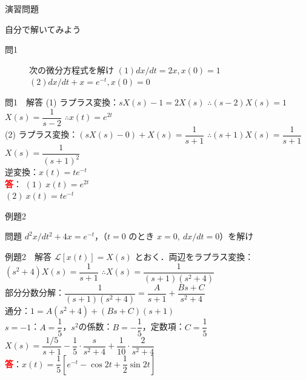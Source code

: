 \documentclass[professionalfonts]{beamer}
\begin{document}
\begin{frame}{演習問題}
  \begin{exampleblock}{自分で解いてみよう}
  \begin{description}
    \item[問1] 次の微分方程式を解け
    $(1) dx/dt = 2x,  x(0) = 1$\\
    $(2) dx/dt + x = e^{-t},  x(0) = 0$\\
  \end{description}
  \end{exampleblock}
\end{frame}

\begin{frame}{問1　解答}
  (1) ラプラス変換：$sX(s) - 1 = 2X(s)$ \quad $\therefore (s-2)X(s) = 1$\\[4pt]
  $X(s) = \dfrac{1}{s-2}$ \quad $\therefore x(t) = e^{2t}$\\[6pt]
  (2) ラプラス変換：$(sX(s)-0) + X(s) = \dfrac{1}{s+1}$ \quad $\therefore (s+1)X(s) = \dfrac{1}{s+1}$\\[4pt]
  $X(s) = \dfrac{1}{(s+1)^{2}}$\\[4pt]
  逆変換：$x(t) = te^{-t}$
  \\[8pt]\textcolor{red}{\textbf{答}}：
  $(1)\ x(t) = e^{2t}$\\
  $(2)\ x(t) = te^{-t}$\\
\end{frame}

\begin{frame}{例題2}
  \begin{exampleblock}{問題}
    $d^{2}x/dt^{2} + 4x = e^{-t}$，（$t=0$ のとき $x=0,\ dx/dt=0$）を解け\\[2pt]
  \end{exampleblock}
\end{frame}

\begin{frame}[shrink=5]{例題2　解答}
  $\mathcal{L}[x(t)] = X(s)$ とおく．両辺をラプラス変換：\\[4pt]
  $(s^{2}+4)X(s) = \dfrac{1}{s+1}$ \quad $\therefore X(s) = \dfrac{1}{(s+1)(s^{2}+4)}$\\[4pt]
  部分分数分解：$\dfrac{1}{(s+1)(s^{2}+4)} = \dfrac{A}{s+1} + \dfrac{Bs+C}{s^{2}+4}$\\[4pt]
  通分：$1 = A(s^{2}+4) + (Bs+C)(s+1)$\\[4pt]
  $s=-1$：$A = \dfrac{1}{5}$，\quad $s^{2}$の係数：$B = -\dfrac{1}{5}$，\quad 定数項：$C = \dfrac{1}{5}$\\[4pt]
  $X(s) = \dfrac{1/5}{s+1} - \dfrac{1}{5}\cdot\dfrac{s}{s^{2}+4} + \dfrac{1}{10}\cdot\dfrac{2}{s^{2}+4}$
  \\[8pt]\textcolor{red}{\textbf{答}}：$x(t) = \dfrac{1}{5}\!\left[e^{-t} - \cos 2t + \dfrac{1}{2}\sin 2t\right]$
\end{frame}
\end{document}
